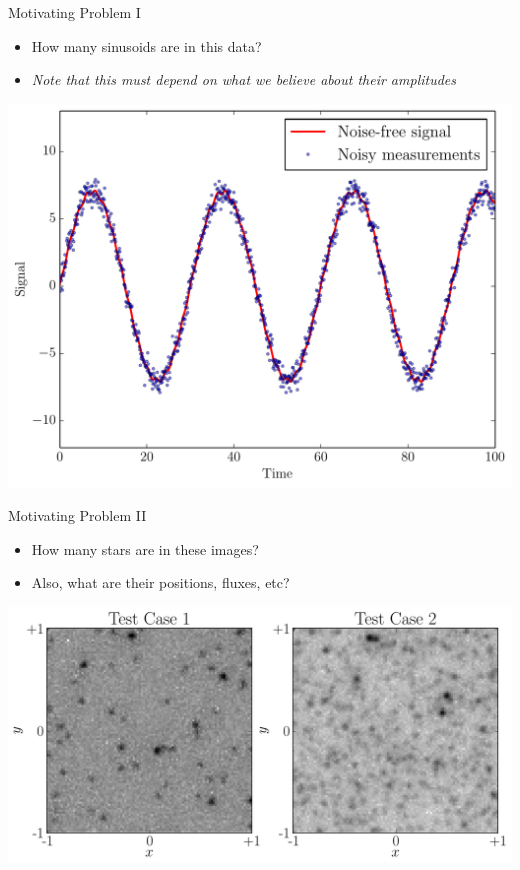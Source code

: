 \begin{frame}[t]{Motivating Problem I}
\begin{itemize}
\item How many sinusoids are in this data?
\item {\it Note that this must depend on what we believe about their amplitudes}
\end{itemize}
\begin{center}
\includegraphics[scale=0.35]{sinewave_data.pdf}
\end{center}
\end{frame}

\begin{frame}[t]{Motivating Problem II}
\begin{itemize}
\item How many stars are in these images?
\item Also, what are their positions, fluxes, etc?
\end{itemize}
\begin{center}
\includegraphics[scale=0.35]{test_cases.pdf}
\end{center}
\end{frame}

